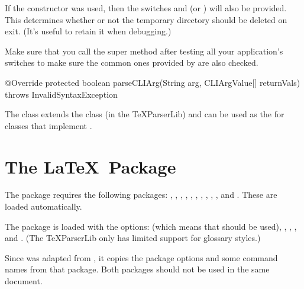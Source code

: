 \documentclass[toc=listof]{scrreport}
\begin{document}
If the constructor  was used, then 
the switches  and 
(or ) will also be provided.
This determines whether or not the temporary directory should be
deleted on exit. (It's useful to retain it when debugging.)

Make sure that you call the 
 super method after
testing all your application's switches to make sure the common ones
provided by  are also checked.
\begin{codebox}
@Override
protected boolean parseCLIArg(String arg, CLIArgValue[] returnVals)
  throws InvalidSyntaxException
\end{codebox}

The  class extends the 
class (in the \gls{TeXParserLib}) and can be used as the
 for classes that implement .

\chapter{The  \LaTeX\ Package}
\label{sec:texjavahelpsty}


The  package requires the following packages:
, , , ,
, , , ,
, ,  and .
These are loaded automatically.

The  package is loaded with the options:
 (which means that  should be used),
, , ,
 and
. (The \gls{TeXParserLib} only has limited
support for glossary styles.)

\begin{information}
Since  was adapted from , it
copies the package options and some command names from that package.
Both packages should not be used in the same document.
\end{information}
\end{document}
